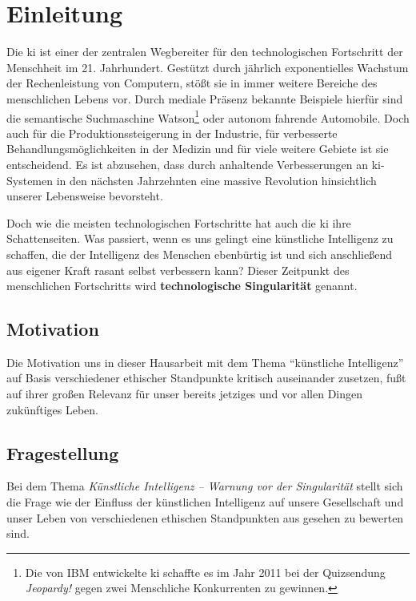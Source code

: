 \section{Einleitung}
Die \ac{ki} ist einer der zentralen Wegbereiter für den technologischen Fortschritt der Menschheit im 21. Jahrhundert.
Gestützt durch jährlich exponentielles Wachstum der Rechenleistung von Computern, stößt sie in immer weitere Bereiche des menschlichen Lebens vor.
Durch mediale Präsenz bekannte Beispiele hierfür sind die semantische Suchmaschine Watson\footnote{Die von IBM entwickelte \ac{ki} schaffte es im Jahr 2011 bei der Quizsendung \textit{Jeopardy!} gegen zwei Menschliche Konkurrenten zu gewinnen.} oder autonom fahrende Automobile. %
Doch auch für die Produktionssteigerung in der Industrie, für verbesserte Behandlungsmöglichkeiten in der Medizin und für viele weitere Gebiete ist sie entscheidend.
Es ist abzusehen, dass durch anhaltende Verbesserungen an \ac{ki}-Systemen in den nächsten Jahrzehnten eine massive Revolution hinsichtlich unserer Lebensweise bevorsteht.

Doch wie die meisten technologischen Fortschritte hat auch die \ac{ki} ihre Schattenseiten.
Was passiert, wenn es uns gelingt eine künstliche Intelligenz zu schaffen, die der Intelligenz des Menschen ebenbürtig ist und sich anschließend aus eigener Kraft rasant selbst verbessern kann?
Dieser Zeitpunkt des menschlichen Fortschritts wird \textbf{technologische Singularität} genannt.

\subsection{Motivation}
Die Motivation uns in dieser Hausarbeit mit dem Thema \enquote{künstliche Intelligenz} auf Basis verschiedener ethischer Standpunkte kritisch auseinander zusetzen, fußt auf ihrer großen Relevanz für unser bereits jetziges und vor allen Dingen zukünftiges Leben.

\subsection{Fragestellung}
Bei dem Thema \textit{Künstliche Intelligenz -- Warnung vor der Singularität} stellt sich die Frage wie der Einfluss der künstlichen Intelligenz auf unsere Gesellschaft und unser Leben von verschiedenen ethischen Standpunkten aus gesehen zu bewerten sind.


